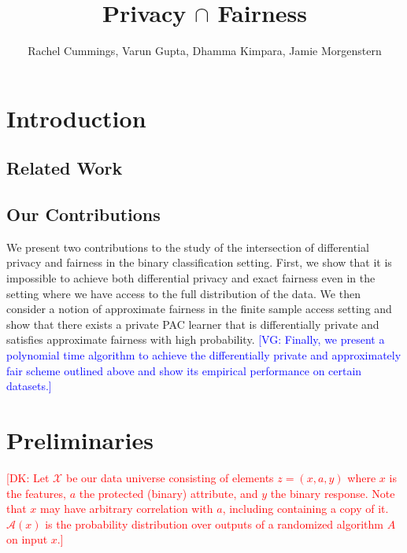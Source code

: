 \documentclass[format = sigconf]{acmart}
\newcommand{\dk}[1]{\textcolor{red}{[DK: #1]}}
\newcommand{\vg}[1]{\textcolor{blue}{[VG: #1]}}
\newcommand{\A}{\mathcal{A}}
\newcommand{\X}{\mathcal{X}}
\newcommand{\1}{\mathbbm{1}}
\theoremstyle{definition}
\begin{document}

\title{Privacy $\cap$ Fairness}
{\author{Rachel Cummings, Varun Gupta, Dhamma Kimpara, Jamie Morgenstern}}
\maketitle


\section{Introduction}
\subsection{Related Work}
\subsection{Our Contributions}
We present two contributions to the study of the intersection of differential privacy and fairness in the binary classification setting. First, we show that it is impossible to achieve both differential privacy and exact fairness even in the setting where we have access to the full distribution of the data. We then consider a notion of approximate fairness in the finite sample access setting and show that there exists a private PAC learner that is differentially private and satisfies approximate fairness with high probability. \vg{Finally, we present a polynomial time algorithm to achieve the differentially private and approximately fair scheme outlined above and show its empirical performance on certain datasets.}

\section{Preliminaries}
\dk {Let $\X$ be our data universe consisting of elements $z=(x,a,y)$ where $x$ is the features, $a$ the protected (binary) attribute, and $y$ the binary response. Note that $x$ may have arbitrary correlation with $a$, including containing a copy of it. $\A(x)$ is the probability distribution over outputs of a randomized algorithm $A$ on input $x$.}

\end{document}
